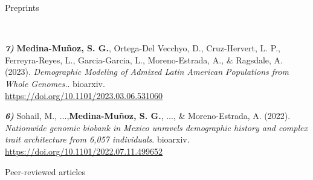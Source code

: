 

\large{Preprints}

\begin{cventries}
\cventry
{$\;$}
{$\;$}
{$\;$}
{$\;$}
{
  \begin{cvitems} %
      \item {
          \begin{flushleft}
            \textit{\textbf{7)}} \textbf{Medina-Muñoz, S. G.}, Ortega-Del Vecchyo, D., Cruz-Hervert, L. P., Ferreyra-Reyes, L., Garcia-Garcia, L., Moreno-Estrada, A., \& Ragsdale, A. (2023).
            \textit{Demographic Modeling of Admixed Latin American Populations from Whole Genomes.}.
            bioarxiv.\\
            \url{https://doi.org/10.1101/2023.03.06.531060}
          \end{flushleft}
        }
      \item {
          \begin{flushleft}
            \textit{\textbf{6)}} Sohail, M., ...,\textbf{Medina-Muñoz, S. G.}, ..., \& Moreno-Estrada, A. (2022).
            \textit{Nationwide genomic biobank in Mexico unravels demographic history and complex trait architecture from 6,057 individuals}. bioarxiv.\\
            \url{https://doi.org/10.1101/2022.07.11.499652}
          \end{flushleft}
        }
  \end{cvitems}
}




\end{cventries}


\large{Peer-reviewed articles}

